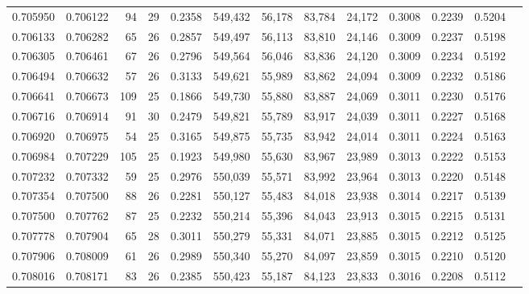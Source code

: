\begin{tabular}{rrrrrrrrrrrrr}
0.705950 & 0.706122 &     94 &    29 &                                     0.2358 & 549,432 &  56,178 &  83,784 &  24,172 & 0.3008 & 0.2239 & 0.5204 \\
0.706133 & 0.706282 &     65 &    26 &                                     0.2857 & 549,497 &  56,113 &  83,810 &  24,146 & 0.3009 & 0.2237 & 0.5198 \\
0.706305 & 0.706461 &     67 &    26 &                                     0.2796 & 549,564 &  56,046 &  83,836 &  24,120 & 0.3009 & 0.2234 & 0.5192 \\
0.706494 & 0.706632 &     57 &    26 &                                     0.3133 & 549,621 &  55,989 &  83,862 &  24,094 & 0.3009 & 0.2232 & 0.5186 \\
0.706641 & 0.706673 &    109 &    25 &                                     0.1866 & 549,730 &  55,880 &  83,887 &  24,069 & 0.3011 & 0.2230 & 0.5176 \\
0.706716 & 0.706914 &     91 &    30 &                                     0.2479 & 549,821 &  55,789 &  83,917 &  24,039 & 0.3011 & 0.2227 & 0.5168 \\
0.706920 & 0.706975 &     54 &    25 &                                     0.3165 & 549,875 &  55,735 &  83,942 &  24,014 & 0.3011 & 0.2224 & 0.5163 \\
0.706984 & 0.707229 &    105 &    25 &                                     0.1923 & 549,980 &  55,630 &  83,967 &  23,989 & 0.3013 & 0.2222 & 0.5153 \\
0.707232 & 0.707332 &     59 &    25 &                                     0.2976 & 550,039 &  55,571 &  83,992 &  23,964 & 0.3013 & 0.2220 & 0.5148 \\
0.707354 & 0.707500 &     88 &    26 &                                     0.2281 & 550,127 &  55,483 &  84,018 &  23,938 & 0.3014 & 0.2217 & 0.5139 \\
0.707500 & 0.707762 &     87 &    25 &                                     0.2232 & 550,214 &  55,396 &  84,043 &  23,913 & 0.3015 & 0.2215 & 0.5131 \\
0.707778 & 0.707904 &     65 &    28 &                                     0.3011 & 550,279 &  55,331 &  84,071 &  23,885 & 0.3015 & 0.2212 & 0.5125 \\
0.707906 & 0.708009 &     61 &    26 &                                     0.2989 & 550,340 &  55,270 &  84,097 &  23,859 & 0.3015 & 0.2210 & 0.5120 \\
0.708016 & 0.708171 &     83 &    26 &                                     0.2385 & 550,423 &  55,187 &  84,123 &  23,833 & 0.3016 & 0.2208 & 0.5112 \\

\end{tabular}
